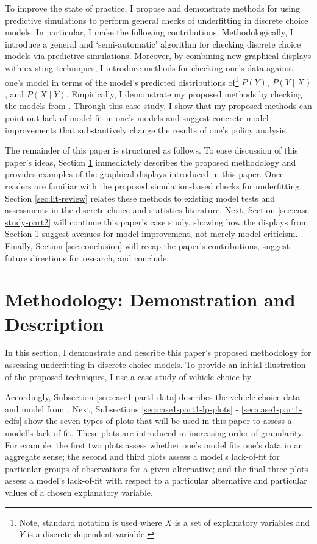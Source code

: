 \documentclass[preprint]{elsarticle}
\begin{document}
To improve the state of practice, I propose and demonstrate methods for using predictive simulations to perform general checks of underfitting in discrete choice models. In particular, I make the following contributions.  Methodologically, I introduce a general and `semi-automatic' algorithm for checking discrete choice models via predictive simulations. Moreover, by combining new graphical displays with existing techniques, I introduce methods for checking one's data against one's model in terms of the model's predicted distributions of\footnote{Note, standard notation is used where $X$ is a set of explanatory variables and $Y$ is a discrete dependent variable.} $P \left( Y \right)$, $P \left( Y \mid X \right)$, and $P \left( X \mid Y \right)$. Empirically, I demonstrate my proposed methods by checking the models from \citet{brownstone_forecasting_1998}. Through this case study, I show that my proposed methods can point out lack-of-model-fit in one's models and suggest concrete model improvements that substantively change the results of one's policy analysis.

The remainder of this paper is structured as follows. To ease discussion of this paper's ideas, Section \ref{sec:methods} immediately describes the proposed methodology and provides examples of the graphical displays introduced in this paper. Once readers are familiar with the proposed simulation-based checks for underfitting, Section \ref{sec:lit-review} relates these methods to existing model tests and assessments in the discrete choice and statistics literature. Next, Section \ref{sec:case-study-part2} will continue this paper's case study, showing how the displays from Section \ref{sec:methods} suggest avenues for model-improvement, not merely model criticism. Finally, Section \ref{sec:conclusion} will recap the paper's contributions, suggest future directions for research, and conclude.

\section{Methodology: Demonstration and Description}
\label{sec:methods}
In this section, I demonstrate and describe this paper's proposed methodology for assessing underfitting in discrete choice models. To provide an initial illustration of the proposed techniques, I use a case study of vehicle choice by \citet{brownstone_forecasting_1998}.

Accordingly, Subsection \ref{sec:case1-part1-data} describes the vehicle choice data and model from \citet{brownstone_forecasting_1998}. Next, Subsections \ref{sec:case1-part1-lp-plots} - \ref{sec:case1-part1-cdfs} show the seven types of plots that will be used in this paper to assess a model's lack-of-fit. These plots are introduced in increasing order of granularity. For example, the first two plots assess whether one's model fits one's data in an aggregate sense; the second and third plots assess a model's lack-of-fit for particular groups of observations for a given alternative; and the final three plots assess a model's lack-of-fit with respect to a particular alternative and particular values of a chosen explanatory variable.
\end{document}
